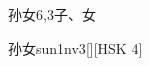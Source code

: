 \begin{entry}{孙女}{6,3}{⼦、⼥}
  \begin{phonetics}{孙女}{sun1nv3}[][HSK 4]
  \end{phonetics}
\end{entry}
